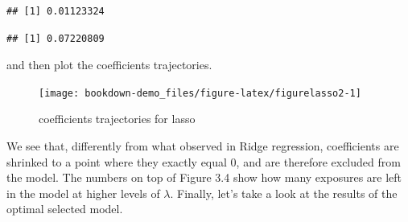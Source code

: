 \documentclass[
]{book}
\newenvironment{Shaded}{\begin{snugshade}}{\end{snugshade}}
\newcommand{\AttributeTok}[1]{\textcolor[rgb]{0.77,0.63,0.00}{#1}}
\newcommand{\CommentTok}[1]{\textcolor[rgb]{0.56,0.35,0.01}{\textit{#1}}}
\newcommand{\ConstantTok}[1]{\textcolor[rgb]{0.00,0.00,0.00}{#1}}
\newcommand{\DecValTok}[1]{\textcolor[rgb]{0.00,0.00,0.81}{#1}}
\newcommand{\FloatTok}[1]{\textcolor[rgb]{0.00,0.00,0.81}{#1}}
\newcommand{\FunctionTok}[1]{\textcolor[rgb]{0.00,0.00,0.00}{#1}}
\newcommand{\NormalTok}[1]{#1}
\newcommand{\OtherTok}[1]{\textcolor[rgb]{0.56,0.35,0.01}{#1}}
\newcommand{\SpecialCharTok}[1]{\textcolor[rgb]{0.00,0.00,0.00}{#1}}
\newcommand{\StringTok}[1]{\textcolor[rgb]{0.31,0.60,0.02}{#1}}
\begin{document}
\begin{Shaded}
\end{Shaded}

\begin{verbatim}
## [1] 0.01123324
\end{verbatim}

\begin{Shaded}
\end{Shaded}

\begin{verbatim}
## [1] 0.07220809
\end{verbatim}

and then plot the coefficients trajectories.

\begin{figure}[H]

{\centering \texttt{[image: bookdown-demo\_files/figure-latex/figurelasso2-1]} 

}

\caption{coefficients trajectories for lasso}\label{fig:figurelasso2}
\end{figure}

We see that, differently from what observed in Ridge regression, coefficients are shrinked to a point where they exactly equal 0, and are therefore excluded from the model. The numbers on top of Figure 3.4 show how many exposures are left in the model at higher levels of \(\lambda\). Finally, let's take a look at the results of the optimal selected model.

\begin{Shaded}
\end{Shaded}
\end{document}
